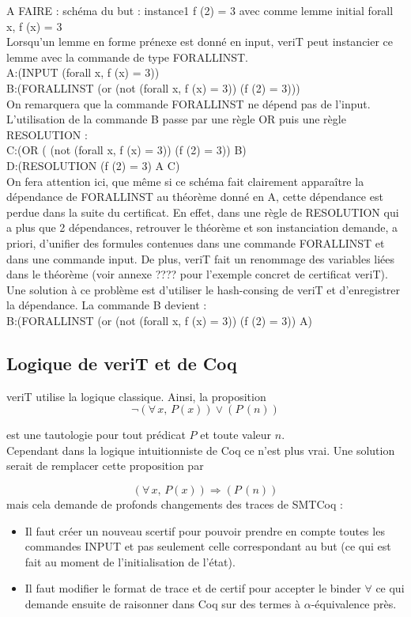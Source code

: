 \documentclass[11pt]{article}
\begin{document}
A FAIRE : schéma du but : instance1 f (2) = 3 avec comme lemme initial forall x, f (x) = 3 \\

Lorsqu'un lemme en forme prénexe est donné en input, veriT peut instancier ce lemme avec la commande de type FORALLINST. \\

A:(INPUT (forall x, f (x) = 3)) \\
B:(FORALLINST (or (not (forall x, f (x) = 3)) (f (2) = 3))) \\

On remarquera que la commande FORALLINST ne dépend pas de l'input. L'utilisation de la commande B passe par une règle OR puis une règle RESOLUTION : \\ 

C:(OR ( (not (forall x, f (x) = 3)) (f (2) = 3)) B) \\ 
D:(RESOLUTION (f (2) = 3) A C) \\ 

On fera attention ici, que même si ce schéma fait clairement apparaître la dépendance de FORALLINST au théorème donné en A, cette dépendance est perdue dans la suite du certificat. En effet, dans une règle de RESOLUTION qui a plus que 2 dépendances, retrouver le théorème et son instanciation demande, a priori, d'unifier des formules contenues dans une commande FORALLINST et dans une commande input. De plus, veriT fait un renommage des variables liées dans le théorème (voir annexe ???? pour l'exemple concret de certificat veriT). Une solution à ce problème est d'utiliser le hash-consing de veriT et d'enregistrer la dépendance. La commande B devient : \\

B:(FORALLINST (or (not (forall x, f (x) = 3)) (f (2) = 3)) A) 

\subsection{Logique de veriT et de Coq}
veriT utilise la logique classique. Ainsi, la proposition 
\[  \neg (\forall \, x, \, P(x)) \vee (P \, (n)) \]

est une tautologie pour tout prédicat $P$ et toute valeur $n$. \\

Cependant dans la logique intuitionniste de Coq ce n'est plus vrai. Une solution serait de remplacer cette proposition par 

\[   (\forall \, x, \, P(x)) \Rightarrow (P \, (n)) \]
mais cela demande de profonds changements des traces de SMTCoq : 
\begin{itemize}

\item Il faut créer un nouveau scertif pour pouvoir prendre en compte toutes les commandes INPUT et pas seulement celle correspondant au but (ce qui est fait au moment de l'initialisation de l'état).
\item Il faut modifier le format de trace et de certif pour accepter le binder $\forall$ ce qui demande ensuite de raisonner dans Coq sur des termes à $\alpha$-équivalence près.
\end{itemize}
\end{document}

